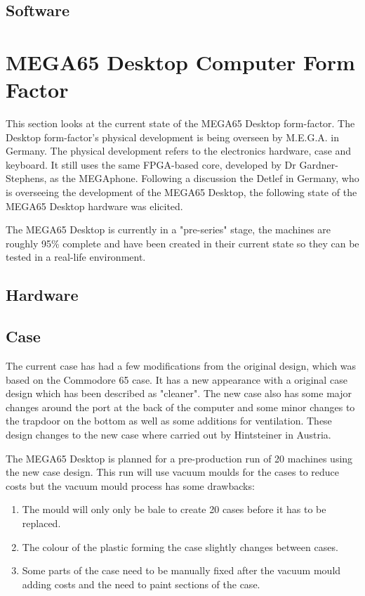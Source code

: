 \subsection{Software}



\section{MEGA65 Desktop Computer Form Factor}
This section looks at the current state of the MEGA65 Desktop form-factor. The Desktop form-factor's physical development is being overseen by M.E.G.A. in Germany. The physical development refers to the electronics hardware, case and keyboard. It still uses the same FPGA-based core, developed by Dr Gardner-Stephens, as the MEGAphone. Following a discussion the Detlef in Germany, who is overseeing the development of the MEGA65 Desktop, the following state of the MEGA65 Desktop hardware was elicited. 

The MEGA65 Desktop is currently in a "pre-series" stage, the machines are roughly 95\% complete and have been created in their current state so they can be tested in a real-life environment. 

\subsection{Hardware}


\subsection{Case}
The current case has had a few modifications from the original design, which was based on the Commodore 65 case. It has a new appearance with a original case design which has been described as "cleaner". The new case also has some major changes around the port at the back of the computer and some minor changes to the trapdoor on the bottom as well as some additions for ventilation. These design changes to the new case where carried out by Hintsteiner in Austria.

The MEGA65 Desktop is planned for a pre-production run of 20 machines using the new case design. This run will use vacuum moulds for the cases to reduce costs but the vacuum mould process has some drawbacks: 
\begin{enumerate}
\item The mould will only only be bale to create 20 cases before it has to be replaced.
\item The colour of the plastic forming the case slightly changes between cases.
\item Some parts of the case need to be manually fixed after the vacuum mould adding costs and the need to paint sections of the case.
\end{enumerate}

